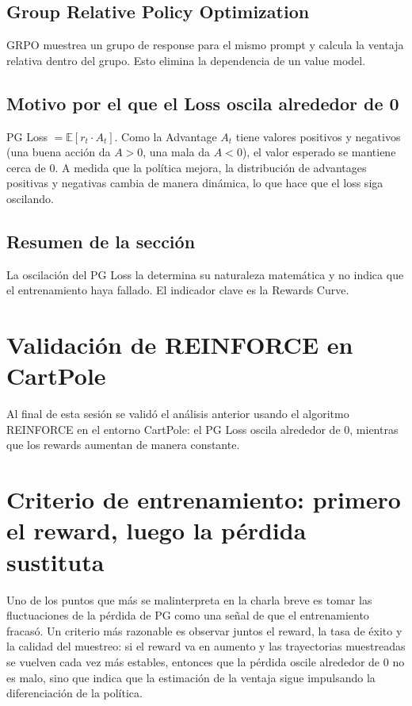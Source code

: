 \documentclass[a4paper]{article}
\begin{document}
\subsection{Group Relative Policy Optimization}
GRPO muestrea un grupo de response para el mismo prompt y calcula la ventaja relativa dentro del grupo. Esto elimina la dependencia de un value model.

\subsection{Motivo por el que el Loss oscila alrededor de 0}
PG Loss $= \mathbb{E}[r_t \cdot A_t]$. Como la Advantage $A_t$ tiene valores positivos y negativos (una buena acción da $A > 0$, una mala da $A < 0$), el valor esperado se mantiene cerca de 0. A medida que la política mejora, la distribución de advantages positivas y negativas cambia de manera dinámica, lo que hace que el loss siga oscilando.

\subsection{Resumen de la sección}
La oscilación del PG Loss la determina su naturaleza matemática y no indica que el entrenamiento haya fallado. El indicador clave es la Rewards Curve.

\section{Validación de REINFORCE en CartPole}
Al final de esta sesión se validó el análisis anterior usando el algoritmo REINFORCE en el entorno CartPole: el PG Loss oscila alrededor de 0, mientras que los rewards aumentan de manera constante.

\newpage
\section{Criterio de entrenamiento: primero el reward, luego la pérdida sustituta}
Uno de los puntos que más se malinterpreta en la charla breve es tomar las fluctuaciones de la pérdida de PG como una señal de que el entrenamiento fracasó. Un criterio más razonable es observar juntos el reward, la tasa de éxito y la calidad del muestreo: si el reward va en aumento y las trayectorias muestreadas se vuelven cada vez más estables, entonces que la pérdida oscile alrededor de 0 no es malo, sino que indica que la estimación de la ventaja sigue impulsando la diferenciación de la política.
\end{document}
